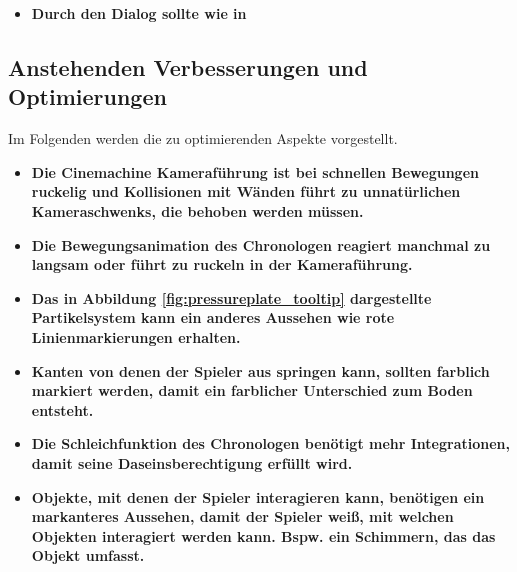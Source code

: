 \begin{itemize}
\item \textbf{Durch den Dialog sollte wie in }
\end{itemize}

\subsection{Anstehenden Verbesserungen und Optimierungen}
Im Folgenden werden die zu optimierenden Aspekte vorgestellt.
\begin{itemize}  
    \item \textbf{Die Cinemachine Kameraführung ist bei schnellen Bewegungen ruckelig und Kollisionen mit Wänden führt zu unnatürlichen Kameraschwenks, die behoben werden müssen.}
    \item \textbf{Die Bewegungsanimation des Chronologen reagiert manchmal zu langsam oder führt zu ruckeln in der Kameraführung.}
     \item \textbf{Das in Abbildung \ref{fig:pressureplate_tooltip} dargestellte Partikelsystem kann ein anderes Aussehen wie  rote Linienmarkierungen erhalten.}
     \item \textbf{Kanten von denen der Spieler aus springen kann, sollten farblich markiert werden, damit ein farblicher Unterschied zum Boden entsteht.}
    \item \textbf{Die Schleichfunktion des Chronologen benötigt mehr Integrationen, damit seine Daseinsberechtigung erfüllt wird.}
    \item \textbf{Objekte, mit denen der Spieler interagieren kann, benötigen ein markanteres Aussehen, damit der Spieler weiß, mit welchen Objekten interagiert werden kann. Bspw. ein Schimmern, das das Objekt umfasst.}
\end{itemize}

